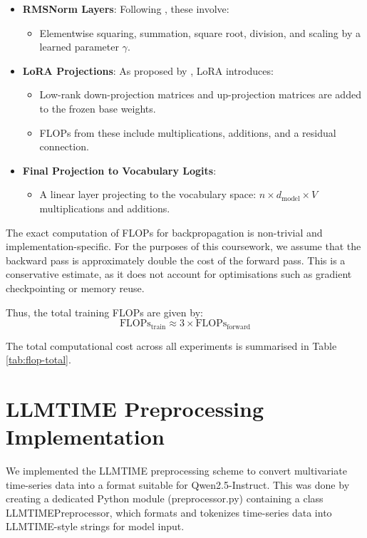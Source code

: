 \documentclass[a4paper,12pt]{article}
\begin{document}
\begin{itemize}
  \item \textbf{RMSNorm Layers}: Following \citet{zhang2019root}, these involve:
  \begin{itemize}
    \item Elementwise squaring, summation, square root, division, and scaling by a learned parameter $\gamma$.
  \end{itemize}

  \item \textbf{LoRA Projections}: As proposed by \citet{hu2021lora}, LoRA introduces:
  \begin{itemize}
    \item Low-rank down-projection matrices and up-projection matrices are added to the frozen base weights.
    \item FLOPs from these include multiplications, additions, and a residual connection.
  \end{itemize}

  \item \textbf{Final Projection to Vocabulary Logits}:
  \begin{itemize}
    \item A linear layer projecting to the vocabulary space: $n \times d_{\text{model}} \times V$ multiplications and additions.
  \end{itemize}
\end{itemize}

The exact computation of FLOPs for backpropagation is non-trivial and implementation-specific. For the purposes of this coursework, we assume that the backward pass is approximately double the cost of the forward pass. This is a conservative estimate, as it does not account for optimisations such as gradient checkpointing or memory reuse.

Thus, the total training FLOPs are given by:
\begin{equation}
\text{FLOPs}_{\text{train}} \approx 3 \times \text{FLOPs}_{\text{forward}}
\end{equation}

The total computational cost across all experiments is summarised in Table \ref{tab:flop-total}.

\section{LLMTIME Preprocessing Implementation}

We implemented the LLMTIME preprocessing scheme \citep{gruver2023language} to convert multivariate time-series data into a format suitable for Qwen2.5-Instruct. This was done by creating a dedicated Python module (preprocessor.py) containing a class LLMTIMEPreprocessor, which formats and tokenizes time-series data into LLMTIME-style strings for model input.
\end{document}
